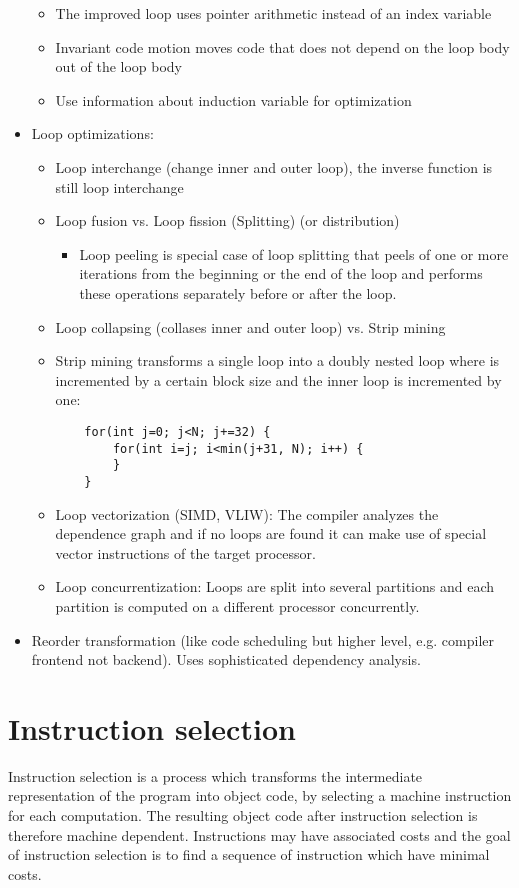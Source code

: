 \documentclass[a4paper,10pt]{article}
\begin{document}
\begin{itemize}
\begin{itemize}
     \item The improved loop uses pointer arithmetic instead of an index variable
     \item Invariant code motion moves code that does not depend on the loop body out of the loop body
     \item Use information about induction variable for optimization
  \end{itemize}
  \item Loop optimizations:
     \begin{itemize}
     \item Loop interchange (change inner and outer loop), the inverse function is still loop interchange
     \item Loop fusion vs. Loop fission (Splitting) (or distribution)
     \begin{itemize}
      \item Loop peeling is special case of loop splitting that peels of one or more iterations from the beginning or the end of the loop and performs these operations separately before or after the loop.
     \end{itemize}
     \item Loop collapsing (collases inner and outer loop) vs. Strip mining 
     \item Strip mining transforms a single loop into a doubly nested loop where is incremented by a certain block size and the inner loop is incremented by one:
     \begin{lstlisting}
	for(int j=0; j<N; j+=32) {
	    for(int i=j; i<min(j+31, N); i++) {
	    }
	}
     \end{lstlisting}
     \item Loop vectorization (SIMD, VLIW): The compiler analyzes the dependence graph and if no loops are found it can make use of 
           special vector instructions of the target processor.
     \item Loop concurrentization: Loops are split into several partitions and each partition is computed on a different processor 	
           concurrently.
 \end{itemize}
 \item Reorder transformation (like code scheduling but higher level, e.g. compiler frontend not backend). Uses sophisticated dependency 
       analysis.
\end{itemize}

\section{Instruction selection}
Instruction selection is a process which transforms the intermediate representation of the program into object code, by 
selecting a machine instruction for each computation. The resulting object code after instruction selection is therefore machine 
dependent. Instructions may have associated costs and the goal of instruction selection is to find a sequence of instruction which have
minimal costs.
\end{document}
